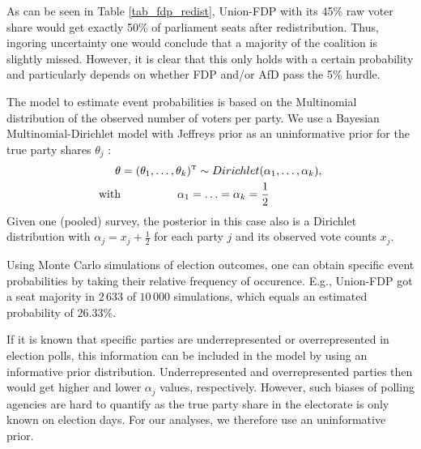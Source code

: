 \documentclass[smallcondensed]{svjour3}     %
\newcommand{\T}{\mathrm{\scriptscriptstyle T}}
\begin{document}
As can be seen in Table \ref{tab_fdp_redist}, Union-FDP with its 45\% raw voter share would get exactly 50\% of parliament seats after redistribution. Thus, ingoring uncertainty one would conclude that a majority of the coalition is slightly missed. However, it is clear that this only holds with a certain probability and particularly depends on whether FDP and/or AfD pass the 5\% hurdle.

The model to estimate event probabilities is based on the Multinomial distribution of the observed
number of voters per party. We use a Bayesian Multinomial-Dirichlet model
with Jeffreys prior as an uninformative prior for the true party shares
$\theta_j$ \citep{gelman_2013}:
\begin{equation}
\begin{aligned}
\boldmath{\theta} &= (\theta_1,\ldots,\theta_k)^\T \sim Dirichlet(\alpha_1,\ldots,\alpha_k), \\
\text{with} &\ \ \ \ \ \ \ \ \ \ \ \ \ \ \ \alpha_1 = \ldots = \alpha_k = \frac{1}{2}
\end{aligned}
\end{equation}
Given one (pooled) survey, the posterior in this case also is a Dirichlet distribution
with $\alpha_j = x_j + \frac{1}{2}$ for each party $j$ and its observed
vote counts $x_j$.

Using Monte Carlo simulations of election outcomes, one can obtain
specific event probabilities by taking their relative frequency of
occurence. E.g., Union-FDP got a seat majority
in $2\,633$ of $10\,000$ simulations, which equals an estimated 
probability of $26.33\%$.

If it is known that specific parties are underrepresented or
overrepresented in election polls, this information
can be included in the model by using an informative prior distribution.
Underrepresented and overrepresented parties then would get higher and lower
$\alpha_j$ values, respectively.
However, such biases of polling agencies are hard to quantify
as the true party share in the electorate is only known on election days.
For our analyses, we therefore use an uninformative prior.
\end{document}
